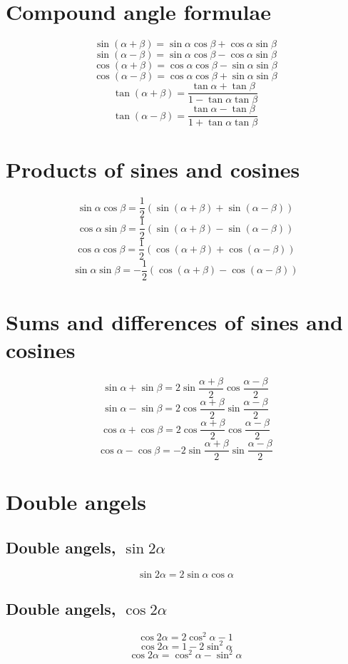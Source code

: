 \documentclass[a4paper, 10pt]{scrartcl}
\begin{document}
\section{Compound angle formulae}
\[\sin{(\alpha + \beta)} = \sin{\alpha}\cos{\beta} + \cos{\alpha}\sin{\beta}\]
\[\sin{(\alpha - \beta)} = \sin{\alpha}\cos{\beta} - \cos{\alpha}\sin{\beta}\]
\[\cos{(\alpha + \beta)} = \cos{\alpha}\cos{\beta} - \sin{\alpha}\sin{\beta}\]
\[\cos{(\alpha - \beta)} = \cos{\alpha}\cos{\beta} + \sin{\alpha}\sin{\beta}\]
\[\tan{(\alpha + \beta)} = \frac{\tan{\alpha} + \tan{\beta}}{1 - \tan{\alpha}\tan{\beta}}\]
\[\tan{(\alpha - \beta)} = \frac{\tan{\alpha} - \tan{\beta}}{1 + \tan{\alpha}\tan{\beta}}\]

\section{Products of sines and cosines}
\[\sin{\alpha}\cos{\beta} = \frac{1}{2}(\sin{(\alpha + \beta)} + \sin{(\alpha - \beta)})\]
\[\cos{\alpha}\sin{\beta} = \frac{1}{2}(\sin{(\alpha + \beta)} - \sin{(\alpha - \beta)})\]
\[\cos{\alpha}\cos{\beta} = \frac{1}{2}(\cos{(\alpha + \beta)} + \cos{(\alpha - \beta)})\]
\[\sin{\alpha}\sin{\beta} = -\frac{1}{2}(\cos{(\alpha + \beta)} - \cos{(\alpha - \beta)})\]

\section{Sums and differences of sines and cosines}
\[\sin{\alpha} + \sin{\beta} = 2\sin{\frac{\alpha + \beta}{2}}\cos{\frac{\alpha - \beta}{2}}\]
\[\sin{\alpha} - \sin{\beta} = 2\cos{\frac{\alpha + \beta}{2}}\sin{\frac{\alpha - \beta}{2}}\]
\[\cos{\alpha} + \cos{\beta} = 2\cos{\frac{\alpha + \beta}{2}}\cos{\frac{\alpha - \beta}{2}}\]
\[\cos{\alpha} - \cos{\beta} = -2\sin{\frac{\alpha + \beta}{2}}\sin{\frac{\alpha - \beta}{2}}\]

\section{Double angels}

\subsection{Double angels, $\sin{2\alpha}$}
\[\sin{2\alpha} = 2\sin{\alpha}\cos{\alpha}\]

\subsection{Double angels, $\cos{2\alpha}$}
\[\cos{2\alpha} = 2\cos^{2}{\alpha} - 1\]
\[\cos{2\alpha} = 1 - 2\sin^{2}{\alpha}\]
\[\cos{2\alpha} = \cos^{2}{\alpha} - \sin^{2}{\alpha}\]
\end{document}
